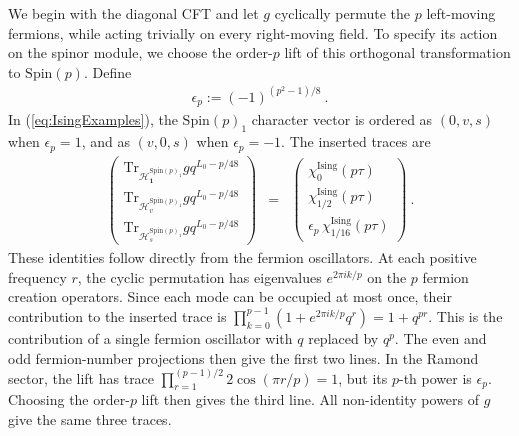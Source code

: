 \documentclass[12pt]{article}
\numberwithin{equation}{section}
\newcommand{\bea}{\begin{eqnarray}}
\newcommand{\eea}{\end{eqnarray}}
\def\cH{\mathcal{H}}
\newcommand{\Tr}{\mathrm{Tr}}
\theoremstyle{remark}
\begin{document}
We begin with the diagonal CFT and let $g$ cyclically permute the $p$ left-moving fermions, while acting trivially on every right-moving field. To specify its action on the spinor module, we choose the order-$p$ lift of this orthogonal transformation to $\mathrm{Spin}(p)$. Define
\bea
\epsilon_p:=(-1)^{(p^2-1)/8}~.
\eea
In (\ref{eq:IsingExamples}), the $\mathrm{Spin}(p)_1$ character vector is ordered as $(0,v,s)$ when $\epsilon_p=1$, and as $(v,0,s)$ when $\epsilon_p=-1$. 
The inserted traces are
\bea \label{eq:SpinCoverTraces}
\begin{pmatrix}
\Tr_{\cH^{\mathrm{Spin}(p)_1}_{\mathbf1}}gq^{L_0-p/48}\\
\Tr_{\cH^{\mathrm{Spin}(p)_1}_{v}}gq^{L_0-p/48}\\
\Tr_{\cH^{\mathrm{Spin}(p)_1}_{s}}gq^{L_0-p/48}
\end{pmatrix}
&=&
\begin{pmatrix}
\chi^{\mathrm{Ising}}_0(p\tau)\\
\chi^{\mathrm{Ising}}_{1/2}(p\tau)\\
\epsilon_p\,\chi^{\mathrm{Ising}}_{1/16}(p\tau)
\end{pmatrix}~.
\eea
These identities follow directly from the fermion oscillators. At each positive frequency $r$, the cyclic permutation has eigenvalues $e^{2\pi i k/p}$ on the $p$ fermion creation operators. Since each mode can be occupied at most once, their contribution to the inserted trace is $\prod_{k=0}^{p-1}(1+e^{2\pi i k/p}q^r)=1+q^{pr}$. This is the contribution of a single fermion oscillator with $q$ replaced by $q^p$. The even and odd fermion-number projections then give the first two lines. In the Ramond sector, the lift has trace $\prod_{r=1}^{(p-1)/2}2\cos(\pi r/p)=1$, but its $p$-th power is $\epsilon_p$. Choosing the order-$p$ lift then gives the third line. 
All non-identity powers of $g$ give the same three traces.
\end{document}
